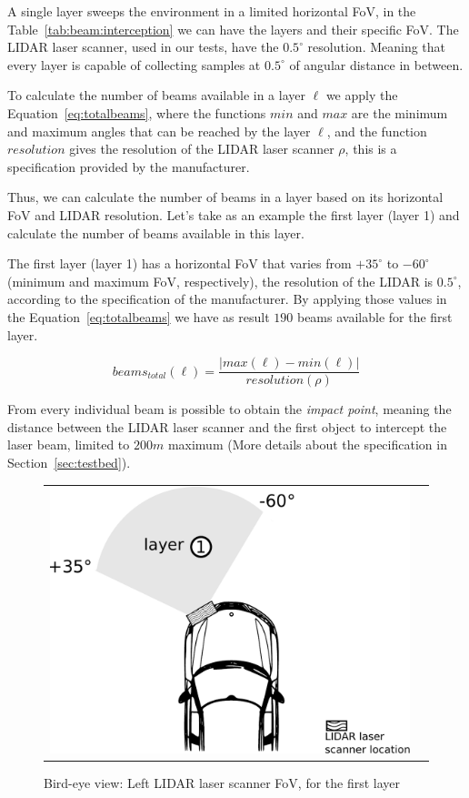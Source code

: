 A single layer sweeps the environment in a limited horizontal FoV, in the Table~\ref{tab:beam:interception} we can have the layers and their specific FoV. The LIDAR laser scanner, used in our tests, have the $0.5^{\circ}$ resolution. Meaning that every layer is capable of collecting samples at $0.5^{\circ}$ of angular distance in between. 

To calculate the number of beams available in a layer $\ell$ we apply the Equation~\ref{eq:totalbeams}, where the functions $min$ and $max$ are the minimum and maximum angles that can be reached by the layer $\ell$, and the function $resolution$ gives the resolution of the LIDAR laser scanner $\rho$, this is a specification provided by the manufacturer. 

Thus, we can calculate the number of beams in a layer based on its horizontal FoV and LIDAR resolution. Let's take as an example the first layer (layer 1) and calculate the number of beams available in this layer. 

The first layer (layer 1) has a horizontal FoV that varies from $+35^\circ$ to $-60^\circ$ (minimum and maximum FoV, respectively), the resolution of the LIDAR is $0.5^\circ$, according to the specification of the manufacturer. By applying those values in  the Equation~\ref{eq:totalbeams} we have as result $190$ beams available for the first layer.

\begin{equation}
\label{eq:totalbeams}
beams_{total}(\ell)=\frac{|max(\ell)-min(\ell)|}{resolution(\rho)}
\end{equation}

From every individual beam is possible to obtain the \textit{impact point}, meaning the distance between the LIDAR laser scanner and the first object to intercept the laser beam, limited to $200m$ maximum (More details about the specification in Section~\ref{sec:testbed}).

\begin{figure}[h]
   \centering
     \begin{tabular}{lr}
       \includegraphics[scale=0.5]{img/fig:demonstrator:superior}
     \end{tabular}
   \caption{Bird-eye view: Left LIDAR laser scanner FoV, for the first layer}
   \label{fig:demonstrator:superior}
\end{figure}


